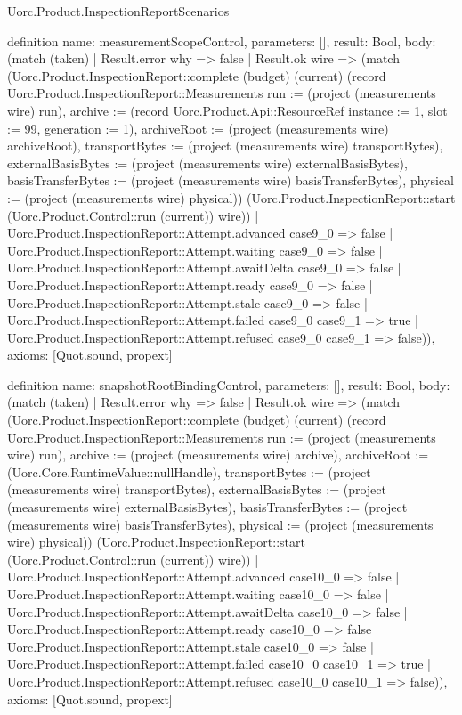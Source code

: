 \begin{lexlean}{Uorc.Product.InspectionReportScenarios}
\begin{semanticmodule}
definition{
  name: measurementScopeControl,
  parameters: [],
  result: Bool,
  body: (match (taken)
    | Result.error why => false
    | Result.ok wire => (match (Uorc.Product.InspectionReport::complete (budget) (current) (record Uorc.Product.InspectionReport::Measurements {run := (project (measurements wire) run), archive := (record Uorc.Product.Api::ResourceRef {instance := 1, slot := 99, generation := 1}), archiveRoot := (project (measurements wire) archiveRoot), transportBytes := (project (measurements wire) transportBytes), externalBasisBytes := (project (measurements wire) externalBasisBytes), basisTransferBytes := (project (measurements wire) basisTransferBytes), physical := (project (measurements wire) physical)}) (Uorc.Product.InspectionReport::start (Uorc.Product.Control::run (current)) wire))
      | Uorc.Product.InspectionReport::Attempt.advanced case9_0 => false
      | Uorc.Product.InspectionReport::Attempt.waiting case9_0 => false
      | Uorc.Product.InspectionReport::Attempt.awaitDelta case9_0 => false
      | Uorc.Product.InspectionReport::Attempt.ready case9_0 => false
      | Uorc.Product.InspectionReport::Attempt.stale case9_0 => false
      | Uorc.Product.InspectionReport::Attempt.failed case9_0 case9_1 => true
      | Uorc.Product.InspectionReport::Attempt.refused case9_0 case9_1 => false)),
  axioms: [Quot.sound, propext]
}

definition{
  name: snapshotRootBindingControl,
  parameters: [],
  result: Bool,
  body: (match (taken)
    | Result.error why => false
    | Result.ok wire => (match (Uorc.Product.InspectionReport::complete (budget) (current) (record Uorc.Product.InspectionReport::Measurements {run := (project (measurements wire) run), archive := (project (measurements wire) archive), archiveRoot := (Uorc.Core.RuntimeValue::nullHandle), transportBytes := (project (measurements wire) transportBytes), externalBasisBytes := (project (measurements wire) externalBasisBytes), basisTransferBytes := (project (measurements wire) basisTransferBytes), physical := (project (measurements wire) physical)}) (Uorc.Product.InspectionReport::start (Uorc.Product.Control::run (current)) wire))
      | Uorc.Product.InspectionReport::Attempt.advanced case10_0 => false
      | Uorc.Product.InspectionReport::Attempt.waiting case10_0 => false
      | Uorc.Product.InspectionReport::Attempt.awaitDelta case10_0 => false
      | Uorc.Product.InspectionReport::Attempt.ready case10_0 => false
      | Uorc.Product.InspectionReport::Attempt.stale case10_0 => false
      | Uorc.Product.InspectionReport::Attempt.failed case10_0 case10_1 => true
      | Uorc.Product.InspectionReport::Attempt.refused case10_0 case10_1 => false)),
  axioms: [Quot.sound, propext]
}


\end{semanticmodule}
\end{lexlean}
